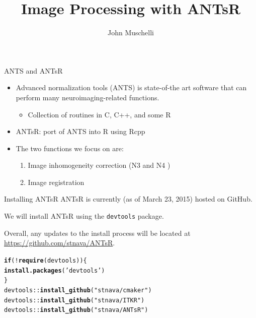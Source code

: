 \documentclass[11pt]{beamer}\usepackage[]{graphicx}\usepackage[]{color}
\author{John Muschelli}
\title{Image Processing with ANTsR}
\institute{Johns Hopkins Bloomberg School of Public Health}
\makeatletter
\newcommand{\hlstr}[1]{\textcolor[rgb]{0.192,0.494,0.8}{#1}}%
\newcommand{\hlopt}[1]{\textcolor[rgb]{0,0,0}{#1}}%
\newcommand{\hlstd}[1]{\textcolor[rgb]{0.345,0.345,0.345}{#1}}%
\newcommand{\hlkwa}[1]{\textcolor[rgb]{0.161,0.373,0.58}{\textbf{#1}}}%
\newcommand{\hlkwd}[1]{\textcolor[rgb]{0.737,0.353,0.396}{\textbf{#1}}}%
\newenvironment{kframe}{%
 \def\at@end@of@kframe{}%
 \ifinner\ifhmode%
  \def\at@end@of@kframe{\end{minipage}}%
  \begin{minipage}{\columnwidth}%
 \fi\fi%
 \def\FrameCommand##1{\hskip\@totalleftmargin \hskip-\fboxsep
 \colorbox{shadecolor}{##1}\hskip-\fboxsep
     \hskip-\linewidth \hskip-\@totalleftmargin \hskip\columnwidth}%
 \MakeFramed {\advance\hsize-\width
   \@totalleftmargin\z@ \linewidth\hsize
   \@setminipage}}%
 {\par\unskip\endMakeFramed%
 \at@end@of@kframe}
\newenvironment{knitrout}{}{} %
\makeatother
\begin{document}
\begin{frame}
\titlepage
\end{frame}





\begin{frame}[fragile]{ANTS and ANTsR}

\begin{itemize}
\item Advanced normalization tools (ANTS) \citep{avants2011reproducible} is state-of-the art software that can perform many neuroimaging-related functions.  
	\begin{itemize}
	\item Collection of routines in C, C++, and some R
	\end{itemize}
\item ANTsR: port of ANTS into R using Rcpp
\item The two functions we focus on are: 
\begin{enumerate}
\item Image inhomogeneity correction (N3 \citep{sled1998nonparametric} and N4 \citep{tustison2010n4itk})
\item Image registration
\end{enumerate} 
\end{itemize}

\end{frame}


\begin{frame}[fragile]{Installing ANTsR}
ANTsR is currently (as of March 23, 2015) hosted on GitHub.  

We will install ANTsR using the \verb|devtools| package.  

Overall, any updates to the install process will be located at \href{https://github.com/stnava/ANTsR}{https://github.com/stnava/ANTsR}.


\begin{knitrout}
\color{fgcolor}\begin{kframe}
\begin{alltt}
\hlkwa{if} \hlstd{(}\hlopt{!}\hlkwd{require}\hlstd{(devtools))\{}
        \hlkwd{install.packages}\hlstd{(}\hlstr{'devtools'}\hlstd{)}
\hlstd{\}}
\hlstd{devtools}\hlopt{::}\hlkwd{install_github}\hlstd{(}\hlstr{"stnava/cmaker"}\hlstd{)}
\hlstd{devtools}\hlopt{::}\hlkwd{install_github}\hlstd{(}\hlstr{"stnava/ITKR"}\hlstd{)}
\hlstd{devtools}\hlopt{::}\hlkwd{install_github}\hlstd{(}\hlstr{"stnava/ANTsR"}\hlstd{)}
\end{alltt}
\end{kframe}
\end{knitrout}
\end{frame}
\end{document}
